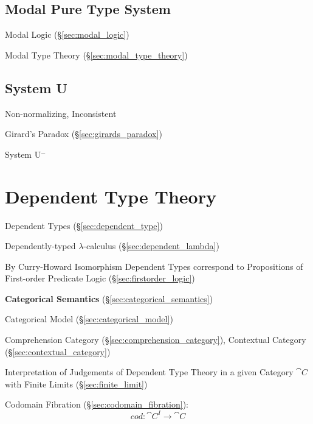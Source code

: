 \subsection{Modal Pure Type System}\label{sec:mpts}

Modal Logic (\S\ref{sec:modal_logic})

Modal Type Theory (\S\ref{sec:modal_type_theory})



\subsection{System U}\label{sec:system_u}

Non-normalizing, Inconsistent

Girard's Paradox (\S\ref{sec:girards_paradox})

System U$^-$



\section{Dependent Type Theory}\label{sec:dependent_type_theory}

Dependent Types (\S\ref{sec:dependent_type})

Dependently-typed $\lambda$-calculus (\S\ref{sec:dependent_lambda})

By Curry-Howard Isomorphism Dependent Types correspond to Propositions
of First-order Predicate Logic (\S\ref{sec:firstorder_logic})


\textbf{Categorical Semantics} (\S\ref{sec:categorical_semantics})

Categorical Model (\S\ref{sec:categorical_model})

Comprehension Category (\S\ref{sec:comprehension_category}),
Contextual Category (\S\ref{sec:contextual_category})

Interpretation of Judgements of Dependent Type Theory in a given
Category $\cat{C}$ with Finite Limits (\S\ref{sec:finite_limit})

Codomain Fibration (\S\ref{sec:codomain_fibration}):
\[
  cod:\cat{C}^I \rightarrow \cat{C}
\]

